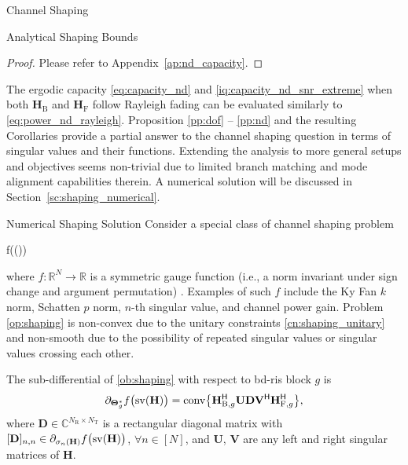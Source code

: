 \documentclass[journal]{IEEEtran}
\begin{document}
\begin{section}{Channel Shaping}
\begin{subsection}{Analytical Shaping Bounds}
		\begin{proof}
			Please refer to Appendix~\ref{ap:nd_capacity}.
		\end{proof}

		The ergodic capacity \eqref{eq:capacity_nd} and \eqref{iq:capacity_nd_snr_extreme} when both $\mathbf{H}_\mathrm{B}$ and $\mathbf{H}_\mathrm{F}$ follow Rayleigh fading can be evaluated similarly to \eqref{eq:power_nd_rayleigh}.
		Proposition \ref{pp:dof} -- \ref{pp:nd} and the resulting Corollaries provide a partial answer to the channel shaping question in terms of singular values and their functions.
		Extending the analysis to more general setups and objectives seems non-trivial due to limited branch matching and mode alignment capabilities therein.
		A numerical solution will be discussed in Section~\ref{sc:shaping_numerical}.
	\end{subsection}

	\begin{subsection}{Numerical Shaping Solution}
		\label{sc:shaping_numerical}
		Consider a special class of channel shaping problem
		\begin{maxi!}
			{\scriptstyle{\mathbf{\Theta}}}{f\bigl(\sv()\bigr)}{\label{op:shaping}}{\label{ob:shaping}}
		\end{maxi!}
		where $f: \mathbb{R}^{N} \to \mathbb{R}$ is a symmetric gauge function (i.e., a norm invariant under sign change and argument permutation) \cite{Watson1992}.
		Examples of such $f$ include the Ky Fan $k$ norm, Schatten $p$ norm, $n$-th singular value, and channel power gain.
		Problem \eqref{op:shaping} is non-convex due to the unitary constraints \eqref{cn:shaping_unitary} and non-smooth due to the possibility of repeated singular values or singular values crossing each other.
		\begin{proposition}
			\label{pp:shaping}
			The sub-differential of \eqref{ob:shaping} with respect to \gls{bd}-\gls{ris} block $g$ is
			\begin{equation}
				\label{eq:shaping_subdiff}
				\partial_{\mathbf{\Theta}_g^*} f\bigl(\operatorname{sv}(\mathbf{H})\bigr) = \operatorname{conv} \bigl\{ \mathbf{H}_{\mathrm{B},g}^\mathsf{H} \mathbf{U} \mathbf{D} \mathbf{V}^\mathsf{H} \mathbf{H}_{\mathrm{F},g}^\mathsf{H} \bigr\},
			\end{equation}
			where $\mathbf{D} \in \mathbb{C}^{N_\mathrm{R} \times N_\mathrm{T}}$ is a rectangular diagonal matrix with $[\mathbf{D}]_{n,n} \in \partial_{\sigma_n(\mathbf{H})} f\bigl(\operatorname{sv}(\mathbf{H})\bigr)$, $\forall n \in [N]$, and $\mathbf{U}$, $\mathbf{V}$ are any left and right singular matrices of $\mathbf{H}$.
		\end{proposition}


\end{subsection}
\end{section}
\end{document}
